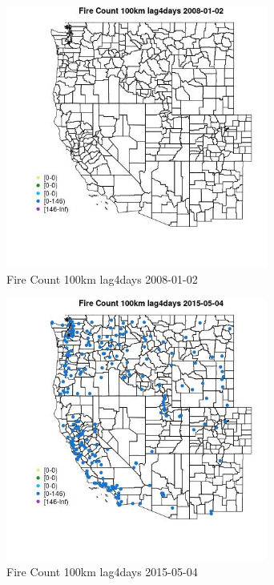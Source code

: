 \begin{figure} 
\centering  
\includegraphics[width=0.77\textwidth]{Code_Outputs/Report_ML_input_PM25_Step4_part_e_de_duplicated_aves_compiled_2019-05-18wNAs_MapObsFire_Count_100km_lag4days2008-01-02.jpg} 
\caption{\label{fig:Report_ML_input_PM25_Step4_part_e_de_duplicated_aves_compiled_2019-05-18wNAsMapObsFire_Count_100km_lag4days2008-01-02}Fire Count 100km lag4days 2008-01-02} 
\end{figure} 
 

\begin{figure} 
\centering  
\includegraphics[width=0.77\textwidth]{Code_Outputs/Report_ML_input_PM25_Step4_part_e_de_duplicated_aves_compiled_2019-05-18wNAs_MapObsFire_Count_100km_lag4days2015-05-04.jpg} 
\caption{\label{fig:Report_ML_input_PM25_Step4_part_e_de_duplicated_aves_compiled_2019-05-18wNAsMapObsFire_Count_100km_lag4days2015-05-04}Fire Count 100km lag4days 2015-05-04} 
\end{figure} 
 

